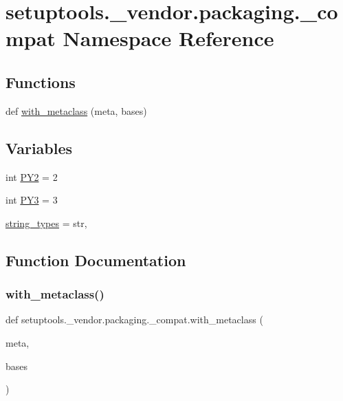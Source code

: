 \hypertarget{namespacesetuptools_1_1__vendor_1_1packaging_1_1__compat}{}\section{setuptools.\+\_\+vendor.\+packaging.\+\_\+compat Namespace Reference}
\label{namespacesetuptools_1_1__vendor_1_1packaging_1_1__compat}
\subsection*{Functions}
\begin{DoxyCompactItemize}
\item 
def \hyperlink{namespacesetuptools_1_1__vendor_1_1packaging_1_1__compat_a6f34cbae1a8cd62fa4dba1b0b0f430ba}{with\+\_\+metaclass} (meta, bases)
\end{DoxyCompactItemize}
\subsection*{Variables}
\begin{DoxyCompactItemize}
\item 
int \hyperlink{namespacesetuptools_1_1__vendor_1_1packaging_1_1__compat_a4415084d95da4720fac05f88782b8b2f}{P\+Y2} = 2
\item 
int \hyperlink{namespacesetuptools_1_1__vendor_1_1packaging_1_1__compat_a3321df16b1ede39f8d13cf5c718f224b}{P\+Y3} = 3
\item 
\hyperlink{namespacesetuptools_1_1__vendor_1_1packaging_1_1__compat_a778de23270f127e8d20921b8ea7e1cc2}{string\+\_\+types} = str,
\end{DoxyCompactItemize}


\subsection{Function Documentation}
\mbox{\label{namespacesetuptools_1_1__vendor_1_1packaging_1_1__compat_a6f34cbae1a8cd62fa4dba1b0b0f430ba}} 
\subsubsection{\texorpdfstring{with\+\_\+metaclass()}{with\_metaclass()}}
{\footnotesize\ttfamily def setuptools.\+\_\+vendor.\+packaging.\+\_\+compat.\+with\+\_\+metaclass (\begin{DoxyParamCaption}\item[{}]{meta,  }\item[{}]{bases }\end{DoxyParamCaption})}

